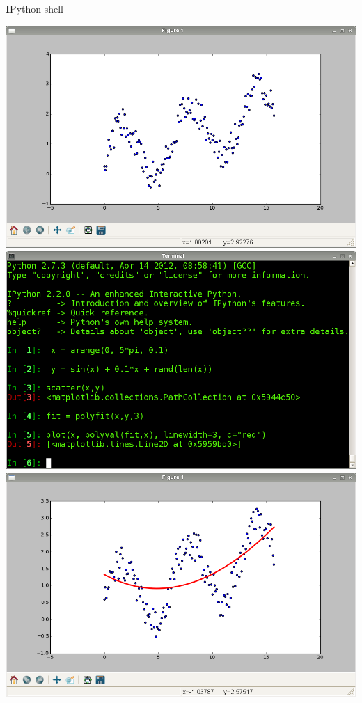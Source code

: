 \documentclass[xcolor=pdftex,dvipsnames,table]{beamer}
\begin{document}
\begin{frame}
\begin{block}{\textbf{I}Python shell}
\begin{overprint}
    \includegraphics[width=\textwidth, height=0.75\textheight]{ipython4.png}
    \includegraphics[width=\textwidth, height=0.75\textheight]{ipython5.png}
    \includegraphics[width=\textwidth, height=0.75\textheight]{ipython6.png}

\end{overprint}
\end{block}
\end{frame}
\end{document}
